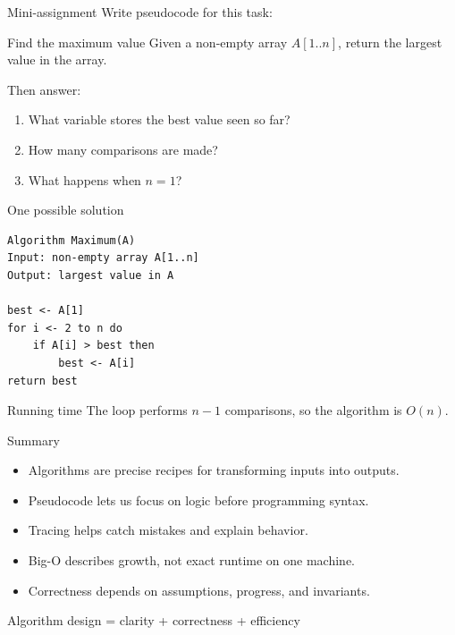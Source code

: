 \documentclass[aspectratio=43,10pt]{beamer}
\begin{document}
\begin{frame}{Mini-assignment}
  Write pseudocode for this task:
  \begin{block}{Find the maximum value}
  Given a non-empty array $A[1..n]$, return the largest value in the array.
  \end{block}

  \vspace{0.5em}
  Then answer:
  \begin{enumerate}
    \item What variable stores the best value seen so far?
    \item How many comparisons are made?
    \item What happens when $n=1$?
  \end{enumerate}
\end{frame}

\begin{frame}[fragile]{One possible solution}
\begin{lstlisting}[style=pseudo]
Algorithm Maximum(A)
Input: non-empty array A[1..n]
Output: largest value in A

best <- A[1]
for i <- 2 to n do
    if A[i] > best then
        best <- A[i]
return best
\end{lstlisting}

\begin{block}{Running time}
The loop performs $n-1$ comparisons, so the algorithm is $O(n)$.
\end{block}
\end{frame}

\begin{frame}{Summary}
  \begin{itemize}
    \item Algorithms are precise recipes for transforming inputs into outputs.
    \item Pseudocode lets us focus on logic before programming syntax.
    \item Tracing helps catch mistakes and explain behavior.
    \item Big-O describes growth, not exact runtime on one machine.
    \item Correctness depends on assumptions, progress, and invariants.
  \end{itemize}

  \vspace{0.8em}
  \begin{center}
    \large Algorithm design = clarity + correctness + efficiency
  \end{center}
\end{frame}
\end{document}
